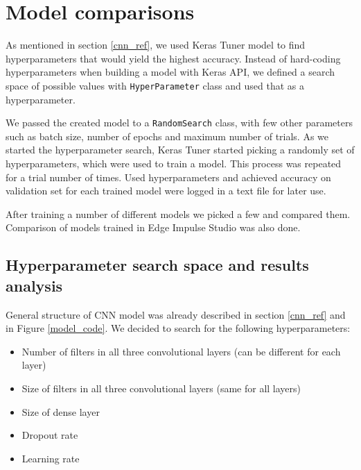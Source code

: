 \section{ Model comparisons}\label{model_comparisons}

As mentioned in section \ref{cnn_ref}, we used Keras Tuner model to find hyperparameters that would yield the highest accuracy.
Instead of hard-coding hyperparameters when building a model with Keras API, we defined a search space of possible values with \verb|HyperParameter| class and used that as a hyperparameter.

We passed the created model to a \verb|RandomSearch| class, with few other parameters such as batch size, number of epochs and maximum number of trials.
As we started the hyperparameter search, Keras Tuner started picking a randomly set of hyperparameters, which were used to train a model.
This process was repeated for a trial number of times.
Used hyperparameters and achieved accuracy on validation set for each trained model were logged in a text file for later use.

After training a number of different models we picked a few and compared them.
Comparison of models trained in Edge Impulse Studio was also done.


\subsection{ Hyperparameter search space and results analysis}

General structure of CNN model was already described in section \ref{cnn_ref} and in Figure \ref{model_code}.
We decided to search for the following hyperparameters: 

\begin{itemize}
    \item Number of filters in all three convolutional layers (can be different for each layer)
    \item Size of filters in all three convolutional layers (same for all layers)
    \item Size of dense layer
    \item Dropout rate 
    \item Learning rate
\end{itemize}

